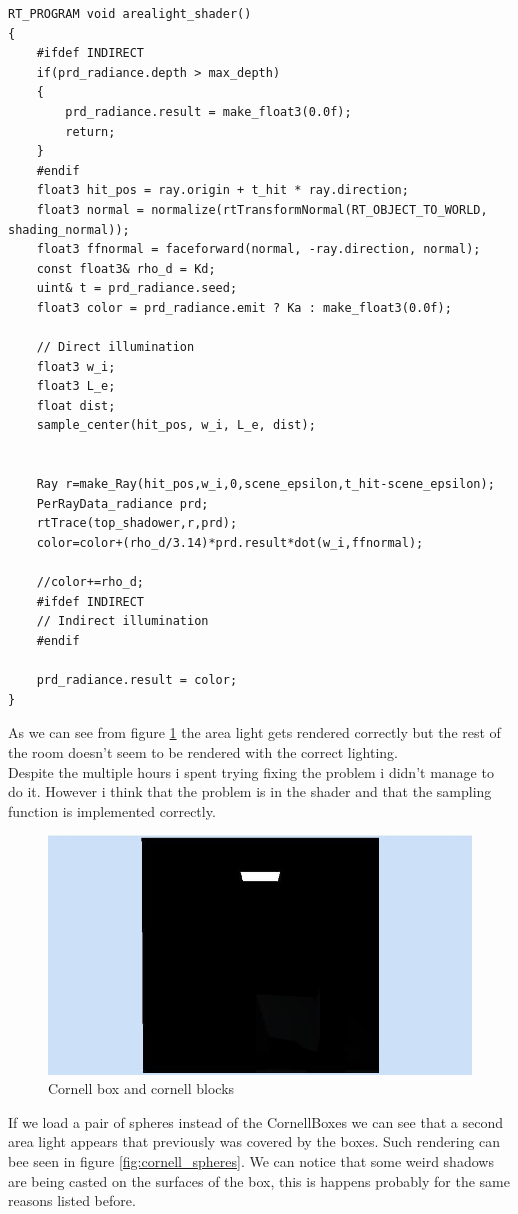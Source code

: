 \begin{lstlisting}
RT_PROGRAM void arealight_shader() 
{
	#ifdef INDIRECT
	if(prd_radiance.depth > max_depth)
	{
		prd_radiance.result = make_float3(0.0f);
		return;
	}
	#endif
	float3 hit_pos = ray.origin + t_hit * ray.direction;
	float3 normal = normalize(rtTransformNormal(RT_OBJECT_TO_WORLD, shading_normal)); 
	float3 ffnormal = faceforward(normal, -ray.direction, normal); 
	const float3& rho_d = Kd;
	uint& t = prd_radiance.seed;
	float3 color = prd_radiance.emit ? Ka : make_float3(0.0f);
	
	// Direct illumination
	float3 w_i;
	float3 L_e;
	float dist;
	sample_center(hit_pos, w_i, L_e, dist);

	
	Ray r=make_Ray(hit_pos,w_i,0,scene_epsilon,t_hit-scene_epsilon);
	PerRayData_radiance prd;
	rtTrace(top_shadower,r,prd);
	color=color+(rho_d/3.14)*prd.result*dot(w_i,ffnormal);
	
	//color+=rho_d;
	#ifdef INDIRECT
	// Indirect illumination
	#endif
	
	prd_radiance.result = color; 
}
\end{lstlisting}
As we can see from figure \ref{fig:area_light} the area light gets rendered correctly but the rest of the room doesn't seem to be rendered with the correct lighting.\\
Despite the multiple hours i spent trying fixing the problem i didn't manage to do it. However i think that the problem is in the shader and that the sampling function is implemented correctly.
\begin{figure}[H]
	\centering
	\includegraphics[scale=\imagescale]{images/project/6}
	\caption{Cornell box and cornell blocks}
	\label{fig:area_light}
\end{figure}
If we load a pair of spheres instead of the CornellBoxes we can see that a second area light appears that previously was covered by the boxes. Such rendering can bee seen in figure \ref{fig:cornell_spheres}. We can notice that some weird shadows are being casted on the surfaces of the box, this is happens probably for the same reasons listed before.
